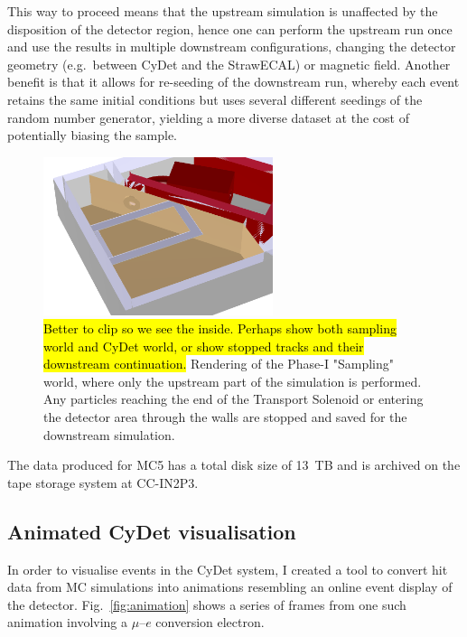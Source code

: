 This way to proceed means that the upstream simulation is unaffected by the disposition of the detector region, hence one can perform the upstream run once and use the results in multiple downstream configurations, changing the detector geometry (e.g.\ between CyDet and the StrawECAL) or magnetic field. 
Another benefit is that it allows for re-seeding of the downstream run, whereby each event retains the same initial conditions but uses several different seedings of the random number generator, yielding a more diverse dataset at the cost of potentially biasing the sample.

\begin{figure}
    \centering
    \includegraphics[width=0.6\textwidth]{chapter3/Phase-I-Sampling-World.png}
    
    \caption{\hl{Better to clip so we see the inside. Perhaps show both sampling world and CyDet world, or show stopped tracks and their downstream continuation.} Rendering of the Phase-I "Sampling" world, where only the upstream part of the simulation is performed. Any particles reaching the end of the Transport Solenoid or entering the detector area through the walls are stopped and saved for the downstream simulation.}
    \label{fig:Phase-I Sampling World}
\end{figure}

The data produced for MC5 has a total disk size of \SI{13}{TB} and is archived on the tape storage system at CC-IN2P3.

\subsection{Animated CyDet visualisation}
In order to visualise events in the CyDet system, I created a tool to convert hit data from MC simulations into animations resembling an online event display of the detector. Fig.~\ref{fig:animation} shows a series of frames from one such animation involving a $\mu$--$e$ conversion electron.

